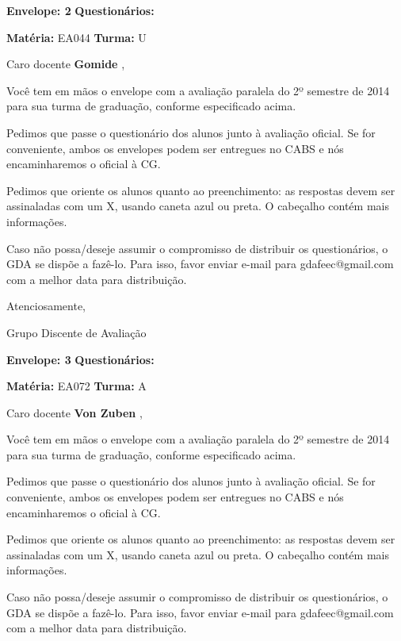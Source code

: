 \documentclass[a5paper]{letter}
\begin{document}
\vspace{0.5cm}

{\bf Envelope: 2 }		\hfill	{\bf Questionários:} \hspace{2cm}

\newpage
\thispagestyle{empty}

\hfill {\bf Matéria:} EA044 {\bf Turma:} U

Caro docente {\bf Gomide }, 

	Você tem em mãos o envelope com a avaliação paralela do 2º semestre de 2014 para sua turma de graduação, conforme especificado acima.

	Pedimos que passe o questionário dos alunos junto à avaliação oficial. Se for conveniente, ambos os envelopes podem ser entregues no CABS e nós encaminharemos o oficial à CG.

Pedimos que oriente os alunos quanto ao preenchimento: as respostas devem ser assinaladas com um X, usando caneta azul ou preta. O cabeçalho contém mais informações.

	Caso não possa/deseje assumir o compromisso de distribuir os questionários, o GDA se dispõe a fazê-lo. Para isso, favor enviar e-mail para gdafeec@gmail.com com a melhor data para distribuição.


Atenciosamente, 

Grupo Discente de Avaliação

\vspace{0.5cm}

{\bf Envelope: 3 }		\hfill	{\bf Questionários:} \hspace{2cm}

\newpage
\thispagestyle{empty}

\hfill {\bf Matéria:} EA072 {\bf Turma:} A

Caro docente {\bf Von Zuben }, 

	Você tem em mãos o envelope com a avaliação paralela do 2º semestre de 2014 para sua turma de graduação, conforme especificado acima.

	Pedimos que passe o questionário dos alunos junto à avaliação oficial. Se for conveniente, ambos os envelopes podem ser entregues no CABS e nós encaminharemos o oficial à CG.

Pedimos que oriente os alunos quanto ao preenchimento: as respostas devem ser assinaladas com um X, usando caneta azul ou preta. O cabeçalho contém mais informações.

	Caso não possa/deseje assumir o compromisso de distribuir os questionários, o GDA se dispõe a fazê-lo. Para isso, favor enviar e-mail para gdafeec@gmail.com com a melhor data para distribuição.
\end{document}
